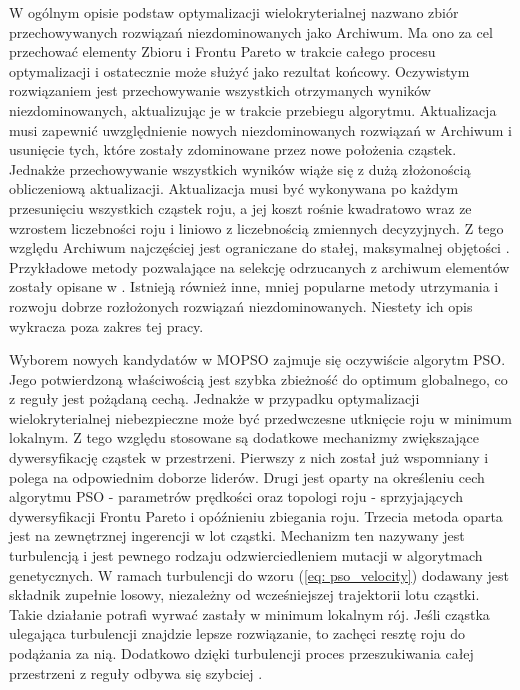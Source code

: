 W ogólnym opisie podstaw optymalizacji wielokryterialnej nazwano zbiór przechowywanych rozwiązań niezdominowanych jako Archiwum. Ma ono za cel przechować elementy Zbioru i Frontu Pareto w trakcie całego procesu optymalizacji i ostatecznie może służyć jako rezultat końcowy. Oczywistym rozwiązaniem jest przechowywanie wszystkich otrzymanych wyników niezdominowanych, aktualizując je w trakcie przebiegu algorytmu. Aktualizacja musi zapewnić uwzględnienie nowych niezdominowanych rozwiązań w Archiwum i usunięcie tych, które zostały zdominowane przez nowe położenia cząstek. Jednakże przechowywanie wszystkich wyników wiąże się z dużą złożonością obliczeniową aktualizacji. Aktualizacja musi być wykonywana po każdym przesunięciu wszystkich cząstek roju, a jej koszt rośnie kwadratowo wraz ze wzrostem liczebności roju i liniowo z liczebnością zmiennych decyzyjnych. Z tego względu Archiwum najczęściej jest ograniczane do stałej, maksymalnej objętości \parencite{Coello2007}. Przykładowe metody pozwalające na selekcję odrzucanych z archiwum elementów zostały opisane w \parencite{Zitzler1999,Knowles2000}. Istnieją również inne, mniej popularne metody utrzymania i rozwoju dobrze rozłożonych rozwiązań niezdominowanych. Niestety ich opis wykracza poza zakres tej pracy.

Wyborem nowych kandydatów w MOPSO zajmuje się oczywiście algorytm PSO. Jego potwierdzoną właściwością jest szybka zbieżność do optimum globalnego, co z reguły jest pożądaną cechą. Jednakże w przypadku optymalizacji wielokryterialnej niebezpieczne może być przedwczesne utknięcie roju w minimum lokalnym. Z tego względu stosowane są dodatkowe mechanizmy zwiększające dywersyfikację cząstek w przestrzeni. Pierwszy z nich został już wspomniany i polega na odpowiednim doborze liderów. Drugi jest oparty na określeniu cech algorytmu PSO - parametrów prędkości oraz topologi roju - sprzyjających dywersyfikacji Frontu Pareto i opóźnieniu zbiegania roju. Trzecia metoda oparta jest na zewnętrznej ingerencji w lot cząstki. Mechanizm ten nazywany jest turbulencją \parencite{Fieldsend} i jest pewnego rodzaju odzwierciedleniem mutacji w algorytmach genetycznych. W ramach turbulencji do wzoru (\ref{eq: pso_velocity}) dodawany jest składnik zupełnie losowy, niezależny od wcześniejszej trajektorii lotu cząstki. Takie działanie potrafi wyrwać zastały w minimum lokalnym rój. Jeśli cząstka ulegająca turbulencji znajdzie lepsze rozwiązanie, to zachęci resztę roju do podążania za nią. Dodatkowo dzięki turbulencji  proces przeszukiwania całej przestrzeni z reguły odbywa się szybciej \parencite{Stacey2003}.

